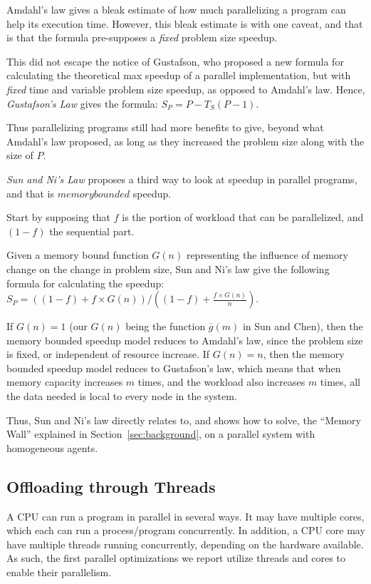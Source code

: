 Amdahl's law gives a bleak estimate of how much parallelizing a program can help its execution time.
However, this bleak estimate is with one caveat, and that is that the formula pre-supposes a \textit{fixed} problem size speedup.

This did not escape the notice of Gustafson\cite{Gustafson:1988:RAL:42411.42415}, who proposed a new formula for calculating the theoretical max speedup of a parallel implementation, but with \textit{fixed} time and variable problem size speedup, as opposed to Amdahl's law.
Hence, \textit{Gustafson's Law} gives the formula: $S_P = P - T_S(P-1)$.

Thus parallelizing programs still had more benefits to give, beyond what Amdahl's law proposed, as long as they increased the problem size along with the size of $P$.

\textit{Sun and Ni's Law}\cite{Sun:1990:VPS:110382.110450,Sun2010183} proposes a third way to look at speedup in parallel programs, and that is $memory bounded$ speedup.

Start by supposing that $f$ is the portion of workload that can be parallelized, and $(1-f)$ the sequential part.

Given a memory bound function $G(n)$ representing the influence of memory change on the change in problem size, Sun and Ni's law give the following formula for calculating the speedup: $S_P = ((1-f)+f\times G(n))/((1-f)+\frac{f\times G(n)}{n})$.

If $G(n)=1$ (our $G(n)$ being the function $\overline{g}(m)$ in Sun and Chen\cite{Sun2010183}), then the memory bounded speedup model reduces to Amdahl's law, since the problem size is fixed, or independent of resource increase.
If $G(n)=n$, then the memory bounded speedup model reduces to Gustafson's law, which means that when memory capacity increases $m$ times, and the workload also increases $m$ times, all the data needed is local to every node in the system.

Thus, Sun and Ni's law directly relates to, and shows how to solve, the ``Memory Wall'' explained in Section~\ref{sec:background}, on a parallel system with homogeneous agents.

\subsection{Offloading through Threads}

A CPU can run a program in parallel in several ways.
It may have multiple cores, which each can run a process/program concurrently.
In addition, a CPU core may have multiple threads running concurrently, depending on the hardware available.
As such, the first parallel optimizations we report utilize threads and cores to enable their parallelism.

